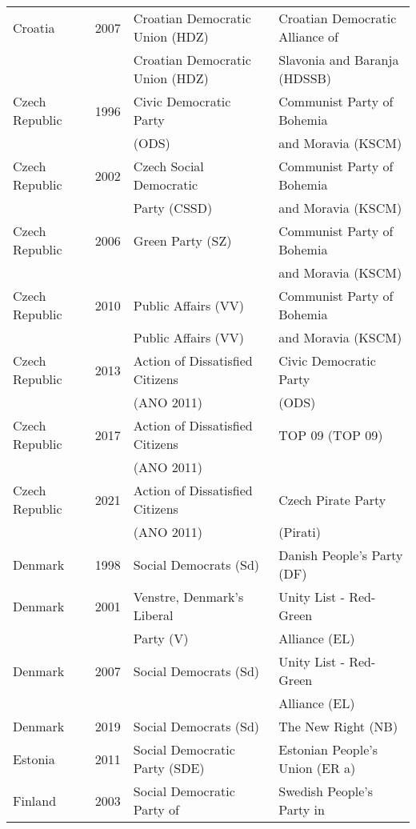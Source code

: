 {\begin{longtable}{|l|c|l|l|}
%
Croatia & 2007 &   Croatian Democratic Union (HDZ) &   Croatian Democratic Alliance of   \\ 
          &      &   Croatian Democratic Union (HDZ) &   Slavonia and Baranja (HDSSB) \\ 
%
Czech Republic & 1996 &   Civic Democratic Party   &   Communist Party of Bohemia   \\ 
                 &   &     (ODS) &     and Moravia (KSCM) \\ 
Czech Republic  & 2002 &   Czech Social Democratic  &   Communist Party of Bohemia  \\ 
   &   &   Party (CSSD) & and Moravia (KSCM) \\ 
Czech Republic & 2006 &   Green Party (SZ) &   Communist Party of Bohemia   \\ 
                 &   &     &  and Moravia (KSCM) \\ 
Czech Republic  & 2010 &   Public Affairs (VV) &   Communist Party of Bohemia   \\ 
   &  & Public Affairs (VV) & and Moravia (KSCM) \\ 
Czech Republic  & 2013 &   Action of Dissatisfied Citizens   &   Civic Democratic Party   \\
 &    &    (ANO 2011) &   (ODS) \\  
Czech Republic   & 2017 &   Action of Dissatisfied Citizens  &   TOP 09 (TOP 09) \\ 
 & &     (ANO 2011) &     \\ 
Czech Republic & 2021 &   Action of Dissatisfied Citizens   &   Czech Pirate Party  \\ 
  &      &   (ANO 2011) &(Pirati) \\ 
%
Denmark & 1998 &   Social Democrats (Sd) &   Danish People's Party (DF) \\ 
Denmark & 2001 &   Venstre, Denmark's Liberal &   Unity List - Red-Green  \\ 
  &  &    Party (V) &     Alliance (EL) \\ 
Denmark & 2007 &   Social Democrats (Sd) &   Unity List - Red-Green   \\ 
    &       &     &     Alliance (EL) \\ 
Denmark & 2019 &   Social Democrats (Sd) &   The New Right (NB) \\ 
%
Estonia & 2011 &        Social Democratic Party (SDE) &   Estonian People's Union (ER a)  \\ 
  Finland & 2003 &        Social Democratic Party of &   Swedish People's Party in   \\ 

\end{longtable}}
